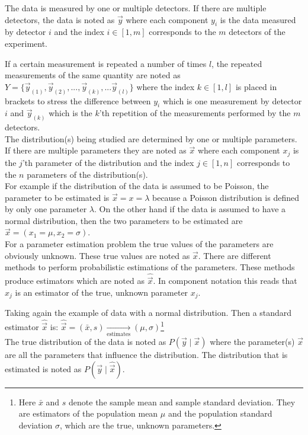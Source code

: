 \documentclass[report,12pt]{report}
\begin{document}
The data is measured by one or multiple detectors. If there are multiple detectors, the data is noted as $\vec y$ where each component $y_i$ is the data measured by detector $i$ and the index $i \in [1,m]$ corresponds to the $m$ detectors of the experiment. 

If a certain measurement is repeated a number of times $l$, the repeated measurements of the same quantity are noted as $Y = \{{\vec y}_{(1)}, {\vec y}_{(2)}, ..., \vec y_{(k)}, ... \vec y_{(l)}\}$ where the index $k \in [1,l]$ is placed in brackets to stress the difference between $y_i$ which is one measurement by detector $i$ and ${\vec y}_{(k)}$ which is the $k$'th repetition of the measurements performed by the $m$ detectors.\\

The distribution(s) being studied are determined by one or multiple parameters. If there are multiple parameters they are noted as $\vec x$ where each component $x_j$ is the $j$'th parameter of the distribution and the index $j \in [1,n]$ corresponds to the $n$ parameters of the distribution(s).\\

For example if the distribution of the data is assumed to be Poisson, the parameter to be estimated is $\vec x = x = \lambda$ because a Poisson distribution is defined by only one parameter $\lambda$. On the other hand if the data is assumed to have a normal distribution, then the two parameters to be estimated are $\vec x = (x_1 = \mu, x_2 = \sigma)$.\\

For a parameter estimation problem the true values of the parameters are obviously unknown. These true values are noted as $\vec x$. There are different methods to perform probabilistic estimations of the parameters. These methods produce estimators which are noted as $\hat{\vec{x}}$. In component notation this reads that $\hat x_j$ is an estimator of the true, unknown parameter $x_j$.

Taking again the example of data with a normal distribution. Then a standard estimator $\hat{\vec x}$ is: $\hat{\vec{x}} =  (\bar x, s) \xrightarrow[\text{estimates}]{} (\mu, \sigma)$\footnote{Here $\bar x$ and $s$ denote the sample mean and sample standard deviation. They are estimators of the population mean $\mu$ and the population standard deviation $\sigma$, which are the true, unknown parameters.}\\

The true distribution of the data is noted as $P(\vec y \mid \vec x)$ where the parameter(s) $\vec x$ are all the parameters that influence the distribution. The distribution that is estimated is noted as $P(\vec y \mid \hat{\vec x})$.
\end{document}
